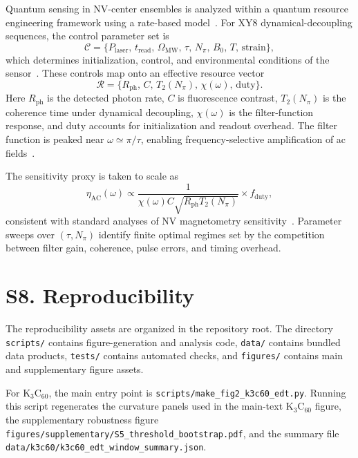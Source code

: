 \documentclass[12pt]{article}
\begin{document}
Quantum sensing in NV-center ensembles is analyzed within a quantum resource
engineering framework using a rate-based model~\cite{NVRateModel2023,Degen2017,Barry2020}.
For XY8 dynamical-decoupling sequences, the control parameter set is
\begin{equation}
\mathcal{C} =
\{P_{\mathrm{laser}},\, t_{\mathrm{read}},\, \Omega_{\mathrm{MW}},\,
\tau,\, N_{\pi},\, B_0,\, T,\, \mathrm{strain}\},
\end{equation}
which determines initialization, control, and environmental conditions of the
sensor~\cite{Casola2018}. These controls map onto an effective resource vector
\begin{equation}
\mathcal{R} =
\{R_{\mathrm{ph}},\, C,\, T_2(N_{\pi}),\, \chi(\omega),\, \mathrm{duty}\}.
\end{equation}
Here $R_{\mathrm{ph}}$ is the detected photon rate, $C$ is fluorescence contrast,
$T_2(N_{\pi})$ is the coherence time under dynamical decoupling, $\chi(\omega)$
is the filter-function response, and $\mathrm{duty}$ accounts for initialization
and readout overhead. The filter function is peaked near $\omega\simeq\pi/\tau$,
enabling frequency-selective amplification of ac fields~\cite{Cywinski2008}.

The sensitivity proxy is taken to scale as
\begin{equation}
\eta_{\mathrm{AC}}(\omega)
\propto
\frac{1}{\chi(\omega)C\sqrt{R_{\mathrm{ph}}T_2(N_{\pi})}}
\times f_{\mathrm{duty}},
\end{equation}
consistent with standard analyses of NV magnetometry sensitivity~\cite{Degen2017,Barry2020}.
Parameter sweeps over $(\tau,N_{\pi})$ identify finite optimal regimes set by
the competition between filter gain, coherence, pulse errors, and timing overhead.

\section*{S8. Reproducibility}

The reproducibility assets are organized in the repository root. The directory
\texttt{scripts/} contains figure-generation and analysis code, \texttt{data/}
contains bundled data products, \texttt{tests/} contains automated checks, and
\texttt{figures/} contains main and supplementary figure assets.

For K$_3$C$_{60}$, the main entry point is
\texttt{scripts/make\_fig2\_k3c60\_edt.py}. Running this script regenerates the
curvature panels used in the main-text K$_3$C$_{60}$ figure, the supplementary
robustness figure \texttt{figures/supplementary/S5\_threshold\_bootstrap.pdf},
and the summary file \texttt{data/k3c60/k3c60\_edt\_window\_summary.json}.
\end{document}
